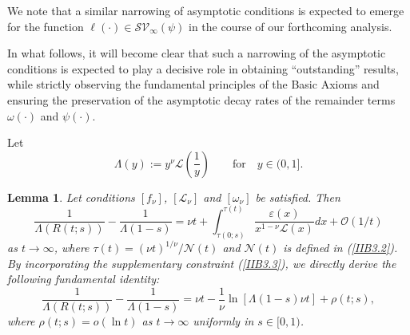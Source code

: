 \documentclass[10pt,reqno]{amsart}
\newtheorem{lemma}{Lemma}
\theoremstyle{definition}
\numberwithin{equation}{section}
\begin{document}
    We note that a similar narrowing of asymptotic conditions is expected to emerge for the function
    $\ell(\cdot)\in{{\mathcal{SV}}_{\infty}}(\psi)$ in the course of our forthcoming analysis.

    In what follows, it will become clear that such a narrowing of the asymptotic conditions is expected to play a decisive
    role in obtaining ``outstanding'' results, while strictly observing the fundamental principles of the Basic Axioms and
    ensuring the preservation of the asymptotic decay rates of the remainder terms $\omega(\cdot)$ and $\psi(\cdot)$.

    Let
\[
    \Lambda(y):={y^{\nu}}\mathcal{L}\left(\frac{1}{y}\right) \qquad {\text{for}} \quad {y\in(0,1]}.
\]

\begin{lemma}                  \label{IIBLem1}
    Let conditions $[{f_{\nu}}]$, $[{{\mathcal{L}}_{\nu}}]$ and $[{{\omega}_{\nu}}]$ be satisfied. Then
\begin{equation}                              \label{IIB3.4}
    \frac{1}{\Lambda(R(t;s))}-\frac{1}{\Lambda(1-s)}=\nu{t}+
    \int_{\tau(0;s)}^{\tau(t)}{\frac{\varepsilon(x)}{{x^{1-\nu}}\mathcal{L}(x)}dx}+
    \mathcal{O}\left(1/t\right)
\end{equation}
    as $t\to\infty$, where $\tau(t)={{(\nu{t})}^{1/\nu}}\big/{\mathcal{N}(t)}$ and $\mathcal{N}(t)$ is defined
    in {(\ref{IIB3.2})}. By incorporating the supplementary constraint {(\ref{IIB3.3})}, we directly derive the
    following fundamental identity:
\begin{equation}                              \label{IIB3.5}
    \frac{1}{\Lambda(R(t;s))}-\frac{1}{\Lambda(1-s)}=\nu{t}-\frac{1}{\nu}\ln\left[\Lambda(1-s)\nu{t}\right]+\rho(t;s),
\end{equation}
    where $\rho(t;s)=o(\ln{t})$ as $t\to\infty$ uniformly in $s\in[0,1)$.
\end{lemma}
\end{document}
